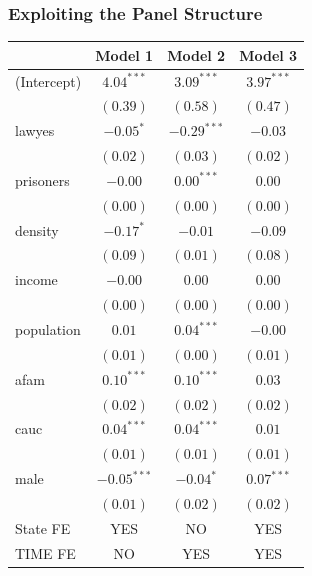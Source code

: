 \documentclass{beamer}
\newcommand{\1}{\mathbb{1}}
\begin{document}
\begin{frame}\frametitle{Exploiting the Panel Structure}
\begin{table}
\tiny
\begin{center}
\begin{tabular}{l c c c }
\hline
 & Model 1 & Model 2 & Model 3 \\
\hline
(Intercept)               & $4.04^{***}$  & $3.09^{***}$  & $3.97^{***}$  \\
                          & $(0.39)$      & $(0.58)$      & $(0.47)$      \\
lawyes                    & $-0.05^{*}$   & $-0.29^{***}$ & $-0.03$       \\
                          & $(0.02)$      & $(0.03)$      & $(0.02)$      \\
prisoners                 & $-0.00$       & $0.00^{***}$  & $0.00$        \\
                          & $(0.00)$      & $(0.00)$      & $(0.00)$      \\
density                   & $-0.17^{*}$   & $-0.01$       & $-0.09$       \\
                          & $(0.09)$      & $(0.01)$      & $(0.08)$      \\
income                    & $-0.00$       & $0.00$        & $0.00$        \\
                          & $(0.00)$      & $(0.00)$      & $(0.00)$      \\
population                & $0.01$        & $0.04^{***}$  & $-0.00$       \\
                          & $(0.01)$      & $(0.00)$      & $(0.01)$      \\
afam                      & $0.10^{***}$  & $0.10^{***}$  & $0.03$        \\
                          & $(0.02)$      & $(0.02)$      & $(0.02)$      \\
cauc                      & $0.04^{***}$  & $0.04^{***}$  & $0.01$        \\
                          & $(0.01)$      & $(0.01)$      & $(0.01)$      \\
male                      & $-0.05^{***}$ & $-0.04^{*}$   & $0.07^{***}$  \\
                          & $(0.01)$      & $(0.02)$      & $(0.02)$      \\
State FE & YES & NO & YES \\
TIME FE & NO & YES & YES \\

\end{tabular}
\end{center}
\end{table}
\end{frame}
\end{document}
